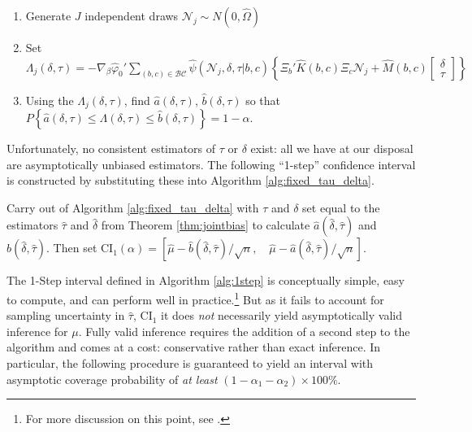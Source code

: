 \begin{alg}
\mbox{}
		\begin{enumerate}
    \item Generate $J$ independent draws $\mathscr{N}_j \sim N(0, \widehat{\Omega})$
			\item Set $\Lambda_j(\delta, \tau)= -\nabla_\beta\widehat{\varphi}_0' \sum_{(b,c) \in \mathcal{BC}} \widehat{\psi}(\mathscr{N}_j,\delta, \tau|b,c) \left\{\Xi_b' \widehat{K}(b,c) \Xi_c \mathscr{N}_j + \widehat{M}(b,c)  \left[\begin{array}{c}\delta \\ \tau \end{array} \right]\right\}$
			\item Using the $\Lambda_j(\delta, \tau)$, find $\widehat{a}(\delta,\tau)$, $\widehat{b}(\delta, \tau)$ so that
		$P\left\{ \widehat{a}(\delta,\tau) \leq\Lambda(\delta,\tau)\leq \widehat{b}(\delta,\tau) \right\} = 1 - \alpha$.
		\end{enumerate}
    \label{alg:fixed_tau_delta}
\end{alg}

Unfortunately, no consistent estimators of $\tau$ or $\delta$ exist: all we have at our disposal are asymptotically unbiased estimators.
The following ``1-step'' confidence interval is constructed by substituting these into Algorithm \ref{alg:fixed_tau_delta}.

\begin{alg} 
  \label{alg:1step}
  Carry out of Algorithm \ref{alg:fixed_tau_delta} with $\tau$ and $\delta$ set equal to the estimators $\widehat{\tau}$ and $\widehat{\delta}$ from Theorem \ref{thm:jointbias} to calculate $\widehat{a}(\widehat{\delta}, \widehat{\tau})$ and $\widehat{b}(\widehat{\delta}, \widehat{\tau})$.
  Then set $\mbox{CI}_{1}(\alpha) = \left[ \widehat{\mu} - \widehat{b}(\widehat{\delta}, \widehat{\tau})/\sqrt{n}, \quad \widehat{\mu} - \widehat{a}(\widehat{\delta}, \widehat{\tau})/\sqrt{n} \right]$.
\end{alg}

The 1-Step interval defined in Algorithm \ref{alg:1step} is conceptually simple, easy to compute, and can perform well in practice.\footnote{For more discussion on this point, see \cite{DiTraglia2016}.}
But as it fails to account for sampling uncertainty in $\widehat{\tau}$, $\mbox{CI}_1$ it does \emph{not} necessarily yield asymptotically valid inference for $\mu$.
Fully valid inference requires the addition of a second step to the algorithm and comes at a cost: conservative rather than exact inference.
In particular, the following procedure is guaranteed to yield an interval with asymptotic coverage probability of \emph{at least} $(1- \alpha_1 - \alpha_2)\times 100\%$.

